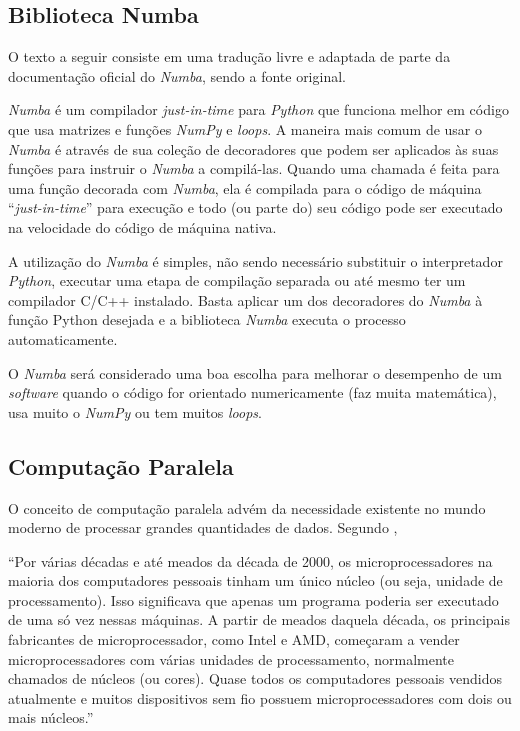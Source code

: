 \documentclass[12pt]{article}
\newcommand{\aspas}[1]{``#1''} %
\newcommand{\citacao}[1]{
	\singlespacing %
	\begin{flushright}
		\begin{minipage}{0.75\linewidth} %
			{\fontsize{10}{\baselineskip}\selectfont \aspas{#1}}
		\end{minipage}
	\end{flushright}
	\onehalfspacing %
}
\begin{document}
\subsection{Biblioteca Numba}
\label{numba}

O texto a seguir consiste em uma tradução livre e adaptada de parte da documentação oficial do \textit{Numba}, sendo \cite{numba:2022} a fonte original.

\textit{Numba} é um compilador \textit{just-in-time} para \textit{Python} que funciona melhor em código que usa matrizes e funções \textit{NumPy} e \textit{loops}. A maneira mais comum de usar o \textit{Numba} é através de sua coleção de decoradores que podem ser aplicados às suas funções para instruir o \textit{Numba} a compilá-las. Quando uma chamada é feita para uma função decorada com \textit{Numba}, ela é compilada para o código de máquina \aspas{\textit{just-in-time}} para execução e todo (ou parte do) seu código pode ser executado na velocidade do código de máquina nativa.

A utilização do \textit{Numba} é simples, não sendo necessário substituir o interpretador \textit{Python}, executar uma etapa de compilação separada ou até mesmo ter um compilador C/C++ instalado. Basta aplicar um dos decoradores do \textit{Numba} à função Python desejada e a biblioteca \textit{Numba} executa o processo automaticamente.

O \textit{Numba} será considerado uma boa escolha para melhorar o desempenho de um \textit{software} quando o código for orientado numericamente (faz muita matemática), usa muito o \textit{NumPy} ou tem muitos \textit{loops}.

\subsection{Computação Paralela}

O conceito de computação paralela advém da necessidade existente no mundo moderno de processar grandes quantidades de dados. Segundo \cite{perkovic:2016}, 

\citacao{Por várias décadas e até meados da década de 2000, os microprocessadores na maioria dos computadores pessoais tinham
	um único núcleo (ou seja, unidade de processamento). Isso significava que apenas um programa poderia ser executado de
	uma só vez nessas máquinas. A partir de meados daquela década, os principais fabricantes de microprocessador, como Intel
	e AMD, começaram a vender microprocessadores com várias unidades de processamento, normalmente chamados
	de núcleos (ou cores). Quase todos os computadores pessoais vendidos atualmente e muitos dispositivos sem fio possuem
	microprocessadores com dois ou mais núcleos.}
\end{document}
